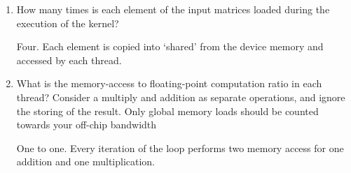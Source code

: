 \documentclass[12pt]{article}
\begin{document}
\begin{enumerate}

\item How many times is each element of the input matrices loaded during the execution of the kernel?

\subitem Four. Each element is copied into `shared' from the device memory and accessed by each thread.

\item What is the memory-access to floating-point computation ratio in each thread?  Consider a multiply and addition as separate operations, and ignore the storing of the result.  Only global memory loads should be counted towards your off-chip bandwidth

\subitem One to one. Every iteration of the loop performs two memory access for one addition and one multiplication. 

\end{enumerate}
\end{document}
